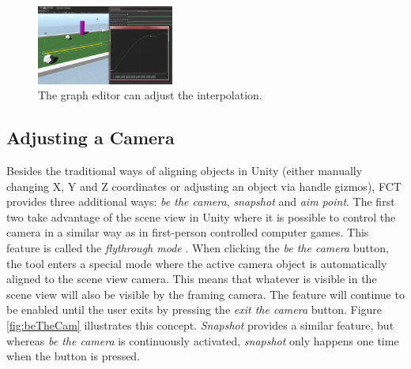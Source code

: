 \begin{figure}[htbp]
\centering
\includegraphics[width=0.4\textwidth]{Pics/curve}
\caption{The graph editor can adjust the interpolation.}
\label{fig:curve}
\end{figure}
\subsection{Adjusting a Camera}

Besides the traditional ways of aligning objects in Unity (either manually changing X, Y and Z coordinates or adjusting an object via handle gizmos), FCT provides three additional ways: \textit{be the camera}, \textit{snapshot} and \textit{aim point}. The first two take advantage of the scene view in Unity where it is possible to control the camera in a similar way as in first-person controlled computer games. This feature is called the \textit{flythrough mode} \cite{unity_flyMode}. When clicking the \textit{be the camera} button, the tool enters a special mode where the active camera object is automatically aligned to the scene view camera. This means that whatever is visible in the scene view will also be visible by the framing camera. The feature will continue to be enabled until the user exits by pressing the \textit{exit the camera} button. Figure \ref{fig:beTheCam} illustrates this concept. \textit{Snapshot} provides a similar feature, but whereas \textit{be the camera} is continuously activated, \textit{snapshot} only happens one time when the button is pressed.

